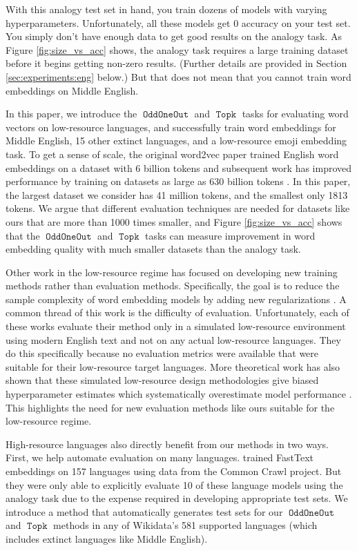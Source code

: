 \documentclass[11pt,a4paper]{article}
\DeclareMathOperator{\OddOneOut}{\texttt{OddOneOut}}
\DeclareMathOperator{\topk}{\texttt{Topk}}
\begin{document}
With this analogy test set in hand,
you train dozens of models with varying hyperparameters.
Unfortunately, all these models get 0 accuracy on your test set.
You simply don't have enough data to get good results on the analogy task.
As Figure \ref{fig:size_vs_acc} shows,
the analogy task requires a large training dataset before it begins getting non-zero results.
(Further details are provided in Section \ref{sec:experiments:eng} below.)
But that does not mean that you cannot train word embeddings on Middle English.

In this paper,
we introduce the $\OddOneOut$ and $\topk$ tasks for evaluating word vectors on low-resource languages, 
and successfully train word embeddings for Middle English, 15 other extinct languages, and a low-resource emoji embedding task.
To get a sense of scale, the original word2vec paper trained English word embeddings on a dataset with 6 billion tokens \citep{mikolov2013efficient} and subsequent work has improved performance by training on datasets as large as 630 billion tokens \citep{grave2018learning}. 
In this paper, the largest dataset we consider has 41 million tokens,
and the smallest only 1813 tokens.
We argue that different evaluation techniques are needed for datasets like ours that are more than 1000 times smaller,
and Figure \ref{fig:size_vs_acc} shows that the $\OddOneOut$ and $\topk$ tasks can measure improvement in word embedding quality with much smaller datasets than the analogy task.

Other work in the low-resource regime has focused on developing new training methods rather than evaluation methods.
Specifically, the goal is to reduce the sample complexity of word embedding models by adding new regularizations \cite{adams-etal-2017-cross,jiang2018learningword,gupta-etal-2019-improving,jungmaier-etal-2020-dirichlet}.
A common thread of this work is the difficulty of evaluation.
Unfortunately, each of these works evaluate their method only in a simulated low-resource environment using modern English text and not on any actual low-resource languages.
They do this specifically because no evaluation metrics were available that were suitable for their low-resource target languages.
More theoretical work has also shown that these simulated low-resource design methodologies give biased hyperparameter estimates which systematically overestimate model performance \citep{kann-etal-2019-towards}.
This highlights the need for new evaluation methods like ours suitable for the low-resource regime.

High-resource languages also directly benefit from our methods in two ways.
First, we help automate evaluation on many languages.
\citet{grave2018learning} trained FastText embeddings on 157 languages using data from the Common Crawl project.
But they were only able to explicitly evaluate 10 of these language models using the analogy task due to the expense required in developing appropriate test sets.
We introduce a method that automatically generates test sets for our $\OddOneOut$ and $\topk$ methods in any of Wikidata's 581 supported languages (which includes extinct languages like Middle English).%
\end{document}
